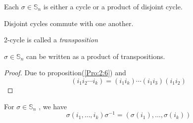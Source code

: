 \begin{proposition}\label{Pro:2:6}
Each $\sigma\in\mathbb{S}_n$ is either a cycle or a product of disjoint cycle.
\end{proposition}
Disjoint cycles commute with one another.
\begin{definition}
2-cycle is called a \emph{transposition}
\end{definition}
\begin{proposition}
$\sigma\in\mathbb{S}_n$ can be written as a product of transpositions.
\end{proposition}
\begin{proof}
Due to proposition(\ref{Pro:2:6}) and
\[
(i_1i_2\cdots i_k) = (i_1i_k)\cdots(i_1i_3)(i_1i_2)
\]
\end{proof}
For $\sigma\in\mathbb{S}_n$
, we have
\[
\sigma(i_1,\dots,i_k)\sigma^{-1}=(\sigma(i_1),\dots,\sigma(i_k))
\]










